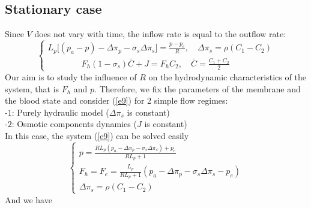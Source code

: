 \documentclass[english,12pt]{article}
\begin{document}
\subsection{Stationary case}
Since $V$ does not vary with time, the inflow rate is equal to the outflow rate:
\begin{equation}\label{e9}
\left\{\begin{array}{ll}
L_p \big[ (p_a-p)- \Delta\pi_{p}-\sigma_{s} \Delta\pi_{s}\big]=\displaystyle{\frac{p-p_{e}}{R}}, \quad \Delta\pi_{s}=\rho(C_1-C_{2})\\
\qquad\qquad F_h (1-\sigma_s) \bar{C}+J=F_h C_2, \quad\overline{C}= \displaystyle{\frac{C_1+C_2}{2}}
\end{array}\right.
\end{equation}
Our aim is to study the influence of $R$ on the hydrodynamic characteristics of the system, that is $F_h$ and $p$. Therefore, we fix the parameters of the membrane and the blood state and consider (\ref{e9}) for 2 simple flow regimes:\\
-$1$: Purely hydraulic model ($\Delta\pi_s$ is constant)\\
-$2$: Osmotic components dynamics ($J$ is constant)\\
In this case, the system (\ref{e9}) can be solved easily
\begin{equation}\label{e10}
\left\{\begin{array}{ll}
p=\displaystyle{\frac{R L_p(p_a-\Delta\pi_{p}-\sigma_{s} \Delta\pi_{s})+p_e}{R L_p+1}}\\
F_h=F_e=\displaystyle{\frac{L_p}{R L_p +1}}(p_a-\Delta\pi_{p}-\sigma_{s} \Delta\pi_{s}-p_e)\\
\Delta\pi_{s}=\rho(C_1-C_{2})
\end{array}\right.
\end{equation}
And we have
\end{document}
